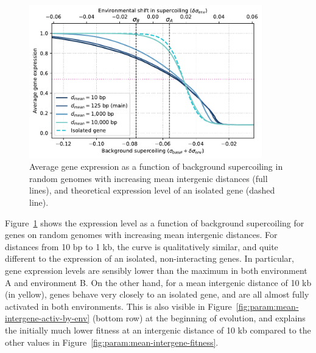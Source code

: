 \begin{figure}[H]
\centering
\includegraphics[width=0.9\textwidth]{param/mean-intergene/random_activ_per_sigma.pdf}
\caption[Average gene expression as a function of background supercoiling, with increasing mean intergenic distances, in random genomes]{Average gene expression as a function of background supercoiling in random genomes with increasing mean intergenic distances (full lines), and theoretical expression level of an isolated gene (dashed line).}
\label{fig:param:mean-intergene-random-activ-by-sigma}
\end{figure}

Figure~\ref{fig:param:mean-intergene-random-activ-by-sigma} shows the expression level as a function of background supercoiling for genes on random genomes with increasing mean intergenic distances.
For distances from 10 bp to 1 kb, the curve is qualitatively similar, and quite different to the expression of an isolated, non-interacting genes.
In particular, gene expression levels are sensibly lower than the maximum in both environment A and environment B.
On the other hand, for a mean intergenic distance of 10 kb (in yellow), genes behave very closely to an isolated gene, and are all almost fully activated in both environments.
This is also visible in Figure~\ref{fig:param:mean-intergene-activ-by-env} (bottom row) at the beginning of evolution, and explains the initially much lower fitness at an intergenic distance of 10 kb compared to the other values in Figure~\ref{fig:param:mean-intergene-fitness}.

